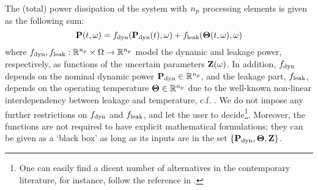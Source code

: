 The (total) power dissipation of the system with ${n_p}$ processing elements is given as the following sum:
\begin{equation} \elabel{power-model}
  \vP(\t, \o) = f_\dyn(\vP_\dyn(\t), \o) + f_\leak(\vTO(\t, \o), \o)
\end{equation}
where $f_{\text{dyn}}, f_{\text{leak}}: \mathbb{R}^{n_p} \times \Omega \to \mathbb{R}^{n_p}$ model the dynamic and leakage power, respectively, as functions of the uncertain parameters $\mathbf{Z}(\omega)$. In addition, $f_{\text{dyn}}$ depends on the nominal dynamic power $\mathbf{P}_{\text{dyn}} \in \mathbb{R}^{n_p}$, and the leakage part, $f_{\text{leak}}$, depends on the operating temperature ${\boldsymbol\Theta} \in \mathbb{R}^{n_p}$ due to the well-known non-linear interdependency between leakage and temperature, c.f. \cite{srivastava2010, liu2007}. We do not impose any further restrictions on $f_{\text{dyn}}$ and $f_{\text{leak}}$, and let the user to decide\footnote{One can easily find a dicent number of alternatives in the contemporary literature, for instance, follow the reference in \cite{srivastava2010}.}. Moreover, the functions are not required to have explicit mathematical formulations; they can be given as a `black box' as long as its inputs are in the set $\{ \mathbf{P}_{\text{dyn}}, {\boldsymbol\Theta}, \mathbf{Z} \}$.
